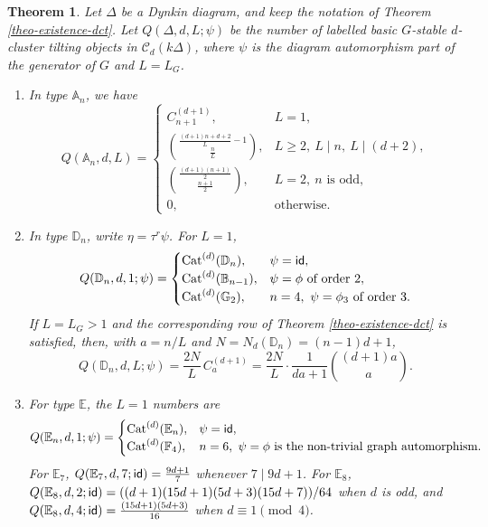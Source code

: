 \documentclass[12pt]{article}
\theoremstyle{plain}
\newtheorem{Theo}[Def]{Theorem}
\theoremstyle{definition}
\DeclareMathOperator{\id}{\sf id}
\renewcommand{\geq}{\geqslant}
\begin{document}
\begin{Theo}\label{theo-counting-dct}
Let \(\Delta\) be a Dynkin diagram, and keep the notation of Theorem
\ref{theo-existence-dct}. Let \(Q(\Delta,d,L;\psi)\) be the number of labelled
basic \(G\)-stable \(d\)-cluster tilting objects in
\(\mathcal{C}_d(k\Delta)\), where \(\psi\) is the diagram automorphism part of
the generator of \(G\) and \(L=L_G\).

\begin{enumerate}
\item In type \(\mathbb A_n\), we have
\[
Q(\mathbb{A}_n,d,L)=
\begin{cases} 
    C_{n+1}^{(d+1)},& L=1,\\
\binom{\frac{(d+1)n+d+2}{L}-1}{\frac nL},
& L\geq2,\ L\mid n,\ L\mid(d+2),\\
\binom{\frac{(d+1)(n+1)}2}{\frac{n+1}2}, & L=2,\ n\text{ is odd},\\
0,& \text{otherwise.}
\end{cases}
\]
\item In type \(\mathbb D_n\), write \(\eta=\tau^r\psi\).  For \(L=1\),
\[
Q(\mathbb{D}_n,d,1;\psi)=
\begin{cases}
\operatorname{Cat}^{(d)}(\mathbb D_n),& \psi=\id,\\
\operatorname{Cat}^{(d)}(\mathbb B_{n-1}),&
\psi=\phi\text{ of order }2,\\
\operatorname{Cat}^{(d)}(\mathbb G_2),&
n=4,\ \psi=\phi_3\text{ of order }3.
\end{cases}
\]
If \(L=L_G>1\) and the corresponding row of Theorem
\ref{theo-existence-dct} is satisfied, then, with
\(a=n/L\) and \(N=N_d(\mathbb D_n)=(n-1)d+1\),
\[
Q(\mathbb{D}_n,d,L;\psi)=
\frac{2N}{L}\, C_a^{(d+1)}
=
\frac{2N}{L}\cdot
\frac{1}{da+1}\binom{(d+1)a}{a}.
\]

\item For type $\mathbb{E}$, the \(L=1\) numbers are
\[
Q(\mathbb{E}_n,d,1;\psi)=
\begin{cases}
\operatorname{Cat}^{(d)}(\mathbb E_n),& \psi=\id,\\
\operatorname{Cat}^{(d)}(\mathbb F_4),&
n=6,\ \psi=\phi\text{ is the non-trivial graph automorphism}.
\end{cases}
\]
For \(\mathbb E_7\),
\(Q(\mathbb E_7,d,7;\id)=\frac{9d+1}{7}\)
whenever \(7\mid 9d+1\).  For \(\mathbb E_8\),
\(Q(\mathbb E_8,d,2;\id)=((d+1)(15d+1)(5d+3)(15d+7))/64\)
when \(d\) is odd, and
\(Q(\mathbb E_8,d,4;\id)=\frac{(15d+1)(5d+3)}{16}\)
when \(d\equiv1\pmod4\).
\end{enumerate}
\end{Theo}
\end{document}
